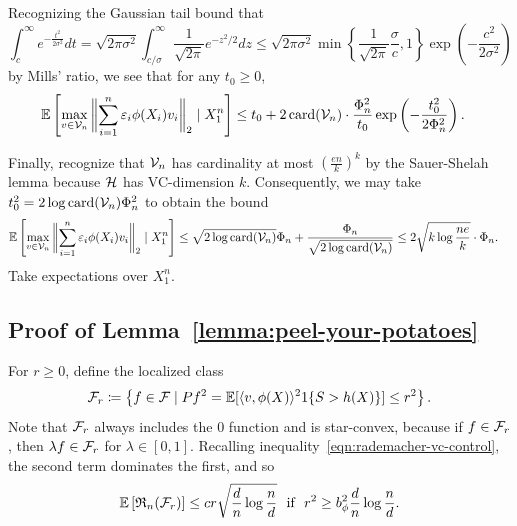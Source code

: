 \documentclass{article}
\newcommand{\radphi}{b_{\phi}}
\newcommand{\scorefunc}{s}
\newcommand{\scoreval}{\scorefunc}
\newcommand{\scorerv}{S}
\begin{document}
Recognizing the Gaussian tail bound
that
\begin{equation*}
  \int_c^\infty e^{-\frac{t^2}{2 \sigma^2}} dt
  = \sqrt{2 \pi \sigma^2}
  \int_{c/\sigma}^\infty \frac{1}{\sqrt{2\pi}} e^{-z^2 / 2} dz
  \le \sqrt{2 \pi \sigma^2}
  \min\left\{\frac{1}{\sqrt{2\pi}}
  \frac{\sigma}{c}, 1 \right\}
  \exp\left(-\frac{c^2}{2\sigma^2}\right)
\end{equation*}
by Mills' ratio, we see that for any $t_0 \ge 0$,
\begin{align*}
  \mathbb{E}\left[\max_{v \in \mathcal{V}_n} \bigg\|{\sum_{i = 1}^n
      \varepsilon_i \phi(X_i) v_i}\bigg\|_2
    \mid X_1^n \right]
  & \le t_0 + 2 \mathop{\rm card}(\mathcal{V}_n)
  \cdot \frac{\Phi_n^2}{t_0}
  \exp\left(-\frac{t_0^2}{2 \Phi_n^2}\right).
\end{align*}

Finally, recognize that $\mathcal{V}_n$ has cardinality at most $(\frac{e
  n}{k})^{k}$ by the Sauer-Shelah lemma because $\mathcal{H}$ has VC-dimension
$k$.
%
Consequently, we may take $t_0^2 = 2 \log \mathop{\rm card}(\mathcal{V}_n) \Phi_n^2$ to
obtain the bound
\begin{align*}
  \mathbb{E}\left[\max_{v \in \mathcal{V}_n} \bigg\|{\sum_{i = 1}^n
      \varepsilon_i \phi(X_i) v_i}\bigg\|_2
    \mid X_1^n \right]
  & \le \sqrt{2 \log \mathop{\rm card}(\mathcal{V}_n)} \Phi_n
  + \frac{\Phi_n}{\sqrt{2 \log \mathop{\rm card}(\mathcal{V}_n)}}
  \le 2 \sqrt{k \log \frac{n e}{k}} \cdot \Phi_n.
\end{align*}
Take expectations over $X_1^n$.

\subsection{Proof of Lemma~\ref{lemma:peel-your-potatoes}}
\label{sec:proof-peel-your-potatoes}

For $r \ge 0$, define the localized class
\begin{equation*}
  \mc{F}_r \defeq
  \left\{f \in \mc{F}
  \mid Pf^2 = \E[\<v, \phi(X)\>^2 \indic{\scorerv
      > h(X)}] \le r^2 \right\}.
\end{equation*}
Note that $\mathcal{F}_r$ always includes the 0 function and is star-convex,
because if $f \in \mathcal{F}_r$, then $\lambda f \in \mathcal{F}_r$ for $\lambda \in
[0, 1]$.
%
Recalling inequality~\eqref{eqn:rademacher-vc-control},
the second term dominates the first, and so
\begin{equation*}
  \E\left[\rademacher_n(\mc{F}_r)\right]
  \le c r \sqrt{\frac{d}{n} \log \frac{n}{d}}
  ~~ \mbox{if}~~
  r^2 \ge \radphi^2 \frac{d}{n} \log \frac{n}{d}.
\end{equation*}
\end{document}
